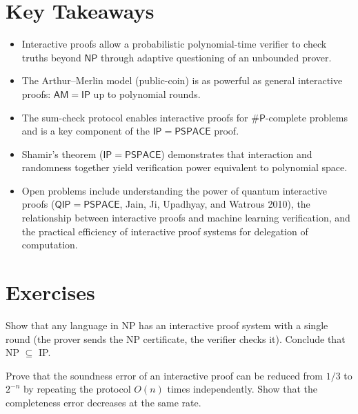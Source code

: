 \section*{Key Takeaways}
\begin{itemize}
\item Interactive proofs allow a probabilistic polynomial-time verifier to check truths beyond $\mathsf{NP}$ through adaptive questioning of an unbounded prover.
\item The Arthur--Merlin model (public-coin) is as powerful as general interactive proofs: $\mathsf{AM} = \mathsf{IP}$ up to polynomial rounds.
\item The sum-check protocol enables interactive proofs for $\#\mathsf{P}$-complete problems and is a key component of the $\mathsf{IP} = \mathsf{PSPACE}$ proof.
\item Shamir's theorem ($\mathsf{IP} = \mathsf{PSPACE}$) demonstrates that interaction and randomness together yield verification power equivalent to polynomial space.
\item Open problems include understanding the power of quantum interactive proofs ($\mathsf{QIP} = \mathsf{PSPACE}$, Jain, Ji, Upadhyay, and Watrous 2010), the relationship between interactive proofs and machine learning verification, and the practical efficiency of interactive proof systems for delegation of computation.
\end{itemize}

\section{Exercises}
\label{sec:ip:exercises}

\begin{exercise}[Basic]
Show that any language in NP has an interactive proof system with a single round (the prover sends the NP certificate, the verifier checks it). Conclude that NP $\subseteq$ IP.
\end{exercise}

\begin{exercise}[Basic]
Prove that the soundness error of an interactive proof can be reduced from $1/3$ to $2^{-n}$ by repeating the protocol $O(n)$ times independently. Show that the completeness error decreases at the same rate.
\end{exercise}

